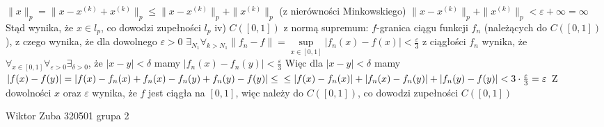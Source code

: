 \documentclass{article}
\begin{document}
$\lVert x\rVert_p=\lVert x-x^{(k)}+x^{(k)}\rVert_p\le\lVert x-x^{(k)}\rVert_p+\rVert x^{(k)}\rVert_p$ (z nierówności Minkowskiego)\newline
$\lVert x-x^{(k)}\rVert_p+\rVert x^{(k)}\rVert_p<\varepsilon+\infty=\infty$\newline
Stąd wynika, że $x\in l_p$, co dowodzi zupełności $l_p$\newline\newline
iv) $C([0,1])$ z normą supremum:\newline
$f$-granica ciągu funkcji $f_n$ (należących do $C([0,1])$), z czego wynika,\newline
że dla dowolnego $\varepsilon>0$ $\exists_{N_1}\forall_{k>N_1} \lVert f_n-f\rVert=\sup\limits_{x\in [0,1]}|f_n(x)-f(x)|<\frac{\varepsilon}{3}$\newline
z ciągłości $f_n$ wynika, że $\forall_{x\in[0,1]}\forall_{\varepsilon>0}\exists_{\delta>0}$, że $|x-y|<\delta$ mamy $|f_n(x)-f_n(y)|<\frac{\varepsilon}{3}$\newline
Więc dla $|x-y|<\delta$ mamy $|f(x)-f(y)|=|f(x)-f_n(x)+f_n(x)-f_n(y)+f_n(y)-f(y)|\le\newline
\le|f(x)-f_n(x)|+|f_n(x)-f_n(y)|+|f_n(y)-f(y)|<3\cdot\frac{\varepsilon}{3}=\varepsilon$\newline
Z dowolności $x$ oraz $\varepsilon$ wynika, że $f$ jest ciągła na $[0,1]$, więc należy do $C([0,1])$, co dowodzi zupełności $C([0,1])$\newpage

Wiktor Zuba 320501 grupa 2
\newline
\end{document}
